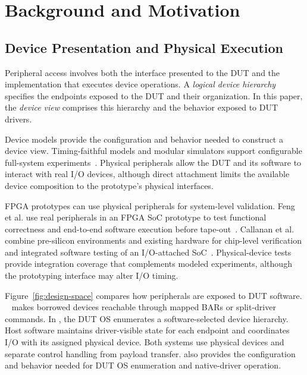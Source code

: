 \section{Background and Motivation}
\label{sec:motivation}

\suppressfloats[t]
\subsection{Device Presentation and Physical Execution}

Peripheral access involves both the interface presented to the DUT and
the implementation that executes device operations. A \emph{logical device hierarchy}
specifies the endpoints exposed to the DUT and their organization. In this
paper, the \emph{device view} comprises this hierarchy and the behavior
exposed to DUT drivers.

Device models provide the configuration and behavior
needed to construct a device view. Timing-faithful models and modular
simulators support configurable full-system
experiments~\cite{karandikar2018firesim,biancolin2019fased,li2022simbricks}.
Physical peripherals allow the DUT and its software to interact with real
I/O devices, although direct attachment limits the available device
composition to the prototype's physical interfaces.

FPGA prototypes can use physical peripherals for system-level validation. Feng et al.
use real peripherals in an FPGA SoC prototype to test functional correctness
and end-to-end software execution
before tape-out~\cite{feng2018accelerator}. Callanan et al. combine pre-silicon
environments and existing hardware for chip-level verification and integrated
software testing of an I/O-attached SoC~\cite{callanan2011prototyping}.
Physical-device tests provide integration coverage that complements modeled
experiments, although the prototyping interface may alter I/O timing.

Figure~\ref{fig:design-space} compares how peripherals are exposed to DUT software.
\sysprevious~\cite{scope2026fpt} makes borrowed devices reachable through
mapped BARs or split-driver commands. In \sys, the DUT OS enumerates a
software-selected device hierarchy. Host software maintains driver-visible
state for each endpoint and coordinates I/O with its assigned physical
device. Both systems use physical devices and separate
control handling from payload transfer. \sys also provides the configuration
and behavior needed for DUT OS enumeration and native-driver operation.

